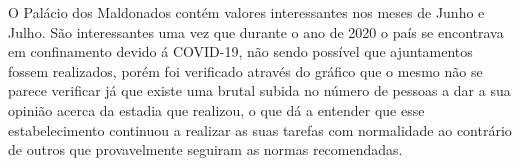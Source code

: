 O Palácio dos Maldonados contém valores interessantes nos meses de Junho e Julho. São interessantes uma vez que durante o ano de 2020 o país se encontrava em confinamento devido á COVID-19, não sendo possível que ajuntamentos fossem realizados, porém foi verificado através do gráfico que o mesmo não se parece verificar já que existe uma brutal subida no número de pessoas a dar a sua opinião acerca da estadia que realizou, o que dá a entender que esse estabelecimento continuou a realizar as suas tarefas com normalidade ao contrário de outros que provavelmente seguiram as normas recomendadas.